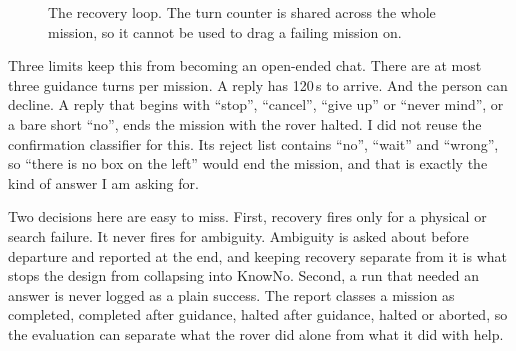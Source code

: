 \begin{figure}[htbp]
  \centering
  \caption{The recovery loop. The turn counter is shared across the whole mission, so it cannot be used to drag a failing mission on.}
  \label{fig:guidance}
\end{figure}

Three limits keep this from becoming an open-ended chat. There are at most three
guidance turns per mission. A reply has 120\,s to arrive. And the person can
decline. A reply that begins with ``stop'', ``cancel'', ``give up'' or ``never
mind'', or a bare short ``no'', ends the mission with the rover halted. I did not
reuse the confirmation classifier for this. Its reject list contains ``no'',
``wait'' and ``wrong'', so ``there is no box on the left'' would end the mission,
and that is exactly the kind of answer I am asking for.

Two decisions here are easy to miss. First, recovery fires only for a physical or
search failure. It never fires for ambiguity. Ambiguity is asked about before
departure and reported at the end, and keeping recovery separate from it is what
stops the design from collapsing into KnowNo. Second, a run that needed an answer
is never logged as a plain success. The report classes a mission as completed,
completed after guidance, halted after guidance, halted or aborted, so the
evaluation can separate what the rover did alone from what it did with help.

